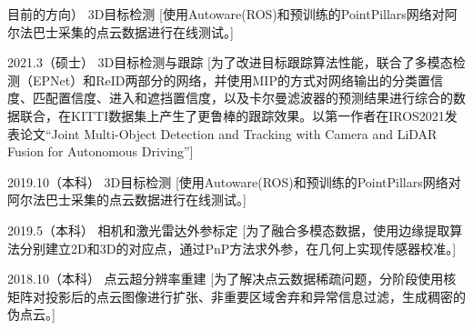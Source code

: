 \documentclass[zh]{resume}
\begin{document}
\begin{experiences}

  \experience%
    {目前的方向）}%
    {3D目标检测}%
    [使用Autoware(ROS)和预训练的PointPillars网络对阿尔法巴士采集的点云数据进行在线测试。] 
    
\separator{0.5ex}
  \experience%
    {2021.3（硕士）}%
    {3D目标检测与跟踪}%
    [为了改进目标跟踪算法性能，联合了多模态检测（EPNet）和ReID两部分的网络，并使用MIP的方式对网络输出的分类置信度、匹配置信度、进入和遮挡置信度，以及卡尔曼滤波器的预测结果进行综合的数据联合，在KITTI数据集上产生了更鲁棒的跟踪效果。以第一作者在IROS2021发表论文``Joint Multi-Object Detection and Tracking with Camera and LiDAR Fusion for Autonomous Driving'']

\separator{0.5ex}
  \experience%
    {2019.10（本科）}%
    {3D目标检测}%
    [使用Autoware(ROS)和预训练的PointPillars网络对阿尔法巴士采集的点云数据进行在线测试。] 

\separator{0.5ex}
  \experience%
    {2019.5（本科）}%
    {相机和激光雷达外参标定}%
    [为了融合多模态数据，使用边缘提取算法分别建立2D和3D的对应点，通过PnP方法求外参，在几何上实现传感器校准。]

\separator{0.5ex}
  \experience%
    {2018.10（本科）}%
    {点云超分辨率重建}%
    [为了解决点云数据稀疏问题，分阶段使用核矩阵对投影后的点云图像进行扩张、非重要区域舍弃和异常信息过滤，生成稠密的伪点云。]   
\end{experiences}

\begin{competences}[12em]
\end{competences}
\end{document}
